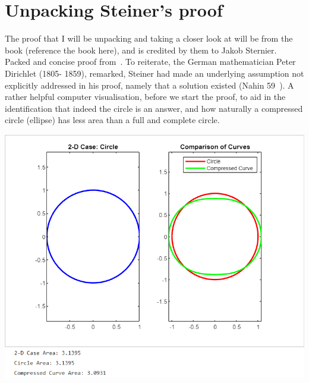 \documentclass[a4paper]{book}
\begin{document}
\section{Unpacking Steiner's proof}
The proof that I will be unpacking and taking a closer look at will be from the book (reference the book here), and is credited by them to Jakob Sternier. Packed and concise proof from~\cite{gluck2012isoperimetric}. To reiterate, the German mathematician Peter Dirichlet (1805- 1859), remarked, Steiner had made an underlying assumption not explicitly addressed in his proof, namely that a solution existed (Nahin 59~\cite{nahin2021least}). A rather helpful computer visualisation, before we start the proof, to aid in the identification that indeed the circle is an answer, and how naturally a compressed circle (ellipse) has less area than a full and complete circle.
\begin{minipage}{\linewidth}
    \centering
    \includegraphics[width=150mm]{steinerproofvisualisation.png}
\end{minipage}
\end{document}
